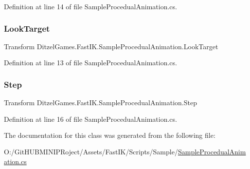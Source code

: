 Definition at line 14 of file Sample\+Procedual\+Animation.\+cs.

\mbox{\label{class_ditzel_games_1_1_fast_i_k_1_1_sample_procedual_animation_a769131f4c7aafd4ff7b4969fea0ba10f}} 
\subsubsection{\texorpdfstring{LookTarget}{LookTarget}}
{\footnotesize\ttfamily Transform Ditzel\+Games.\+Fast\+I\+K.\+Sample\+Procedual\+Animation.\+Look\+Target}



Definition at line 13 of file Sample\+Procedual\+Animation.\+cs.

\mbox{\label{class_ditzel_games_1_1_fast_i_k_1_1_sample_procedual_animation_a9f970cdab7b83239effe8eb63c3a375c}} 
\subsubsection{\texorpdfstring{Step}{Step}}
{\footnotesize\ttfamily Transform Ditzel\+Games.\+Fast\+I\+K.\+Sample\+Procedual\+Animation.\+Step}



Definition at line 16 of file Sample\+Procedual\+Animation.\+cs.



The documentation for this class was generated from the following file\+:\begin{DoxyCompactItemize}
\item 
O\+:/\+Git\+H\+U\+B\+M\+I\+N\+I\+P\+Roject/\+Assets/\+Fast\+I\+K/\+Scripts/\+Sample/\mbox{\hyperlink{_sample_procedual_animation_8cs}{Sample\+Procedual\+Animation.\+cs}}\end{DoxyCompactItemize}
